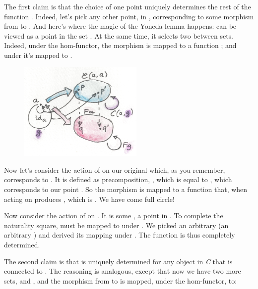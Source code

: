 \noindent
The first claim is that the choice of one point  uniquely
determines the rest of the function . Indeed, let's pick any
other point,  in , corresponding to
some morphism  from  to . And here's where
the magic of the Yoneda lemma happens:  can be viewed as a
point  in the set . At the same time,
it selects two  between sets. Indeed, under the
hom-functor, the morphism  is mapped to a function
; and under  it's mapped to .

\begin{figure}[H]
\centering
\includegraphics[width=60mm]{images/yoneda4.png}
\end{figure}

\noindent
Now let's consider the action of  on our original
 which, as you remember, corresponds to . It is
defined as precomposition, , which is equal to ,
which corresponds to our point . So the morphism
 is mapped to a function that, when acting on 
produces , which is . We have come full
circle!

Now consider the action of  on . It is some
, a point in . To complete the naturality
square,  must be mapped to  under
. We picked an arbitrary  (an arbitrary
) and derived its mapping under . The function
 is thus completely determined.

The second claim is that  is uniquely determined for any
object  in \emph{C} that is connected to . The
reasoning is analogous, except that now we have two more sets,
 and , and the morphism  from
 to  is mapped, under the hom-functor, to:

